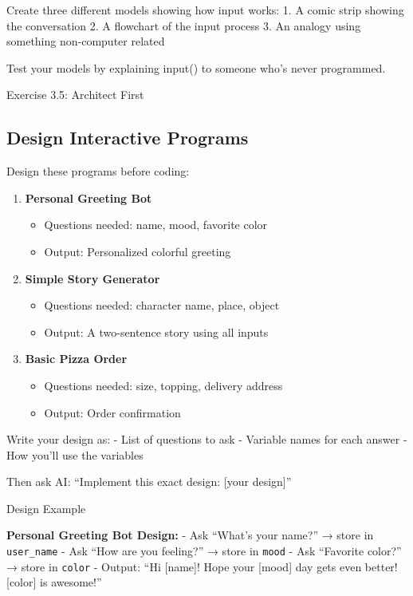 \documentclass[
  letterpaper,
  DIV=11,
  numbers=noendperiod,
  oneside]{scrreprt}
\providecommand{\tightlist}{%
  \setlength{\itemsep}{0pt}\setlength{\parskip}{0pt}}\usepackage{longtable,booktabs,array}
\begin{document}
Create three different models showing how input works: 1. A comic strip
showing the conversation 2. A flowchart of the input process 3. An
analogy using something non-computer related

Test your models by explaining input() to someone who's never
programmed.

Exercise 3.5: Architect First

\subsection{Design Interactive
Programs}\label{design-interactive-programs}

Design these programs before coding:

\begin{enumerate}
\def\labelenumi{\arabic{enumi}.}
\tightlist
\item
  \textbf{Personal Greeting Bot}

  \begin{itemize}
  \tightlist
  \item
    Questions needed: name, mood, favorite color
  \item
    Output: Personalized colorful greeting
  \end{itemize}
\item
  \textbf{Simple Story Generator}

  \begin{itemize}
  \tightlist
  \item
    Questions needed: character name, place, object
  \item
    Output: A two-sentence story using all inputs
  \end{itemize}
\item
  \textbf{Basic Pizza Order}

  \begin{itemize}
  \tightlist
  \item
    Questions needed: size, topping, delivery address
  \item
    Output: Order confirmation
  \end{itemize}
\end{enumerate}

Write your design as: - List of questions to ask - Variable names for
each answer - How you'll use the variables

Then ask AI: ``Implement this exact design: {[}your design{]}''

Design Example

\textbf{Personal Greeting Bot Design:} - Ask ``What's your name?'' →
store in \texttt{user\_name} - Ask ``How are you feeling?'' → store in
\texttt{mood} - Ask ``Favorite color?'' → store in \texttt{color} -
Output: ``Hi {[}name{]}! Hope your {[}mood{]} day gets even better!
{[}color{]} is awesome!''
\end{document}
